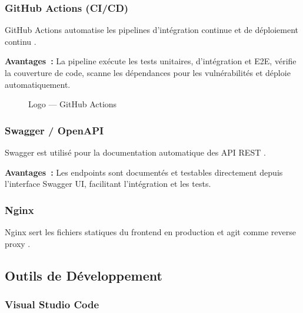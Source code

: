 \subsubsection{GitHub Actions (CI/CD)}

\noindent GitHub Actions automatise les pipelines d'intégration continue et de déploiement
continu \cite{GitHubActions}.

\textbf{Avantages~:} La pipeline exécute les tests unitaires, d'intégration et E2E, vérifie
la couverture de code, scanne les dépendances pour les vulnérabilités et déploie
automatiquement.

\begin{figure}[H]
    \centering
    \caption{Logo --- GitHub Actions}
    \label{fig:logo_github}
\end{figure}

\subsubsection{Swagger / OpenAPI}

\noindent Swagger est utilisé pour la documentation automatique des API REST \cite{Swagger}.

\textbf{Avantages~:} Les endpoints sont documentés et testables directement depuis
l'interface Swagger UI, facilitant l'intégration et les tests.

\subsubsection{Nginx}

\noindent Nginx sert les fichiers statiques du frontend en production et agit comme
reverse proxy \cite{Nginx}.

\subsection{Outils de Développement}

\subsubsection{Visual Studio Code}

